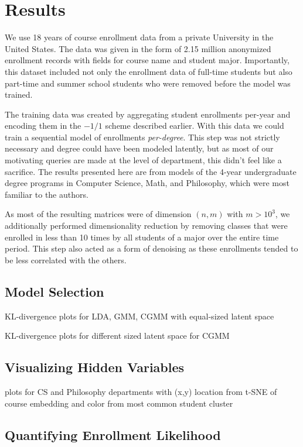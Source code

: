 \documentclass{edm_template}
\begin{document}
\section{Results}

We use 18 years of course enrollment data from a private University in the United States. The data was given in the form of 2.15 million anonymized enrollment records with fields for course name and student major. Importantly, this dataset included not only the enrollment data of full-time students but also part-time and summer school students who were removed before the model was trained. 

The training data was created by aggregating student enrollments per-year and encoding them in the $-1/1$ scheme described earlier. With this data we could train a sequential model of enrollments \textit{per-degree}. This step was not strictly necessary and degree could have been modeled latently, but as most of our motivating queries are made at the level of department, this didn't feel like a sacrifice. The results presented here are from models of the 4-year undergraduate degree programs in Computer Science, Math, and Philosophy, which were most familiar to the authors. 

As most of the resulting matrices were of dimension $(n,m)$ with $m > 10^3$, we additionally performed dimensionality reduction by removing classes that were enrolled in less than 10 times by all students of a major over the entire time period. This step also acted as a form of denoising as these enrollments tended to be less correlated with the others. 

\subsection{Model Selection}

KL-divergence plots for LDA, GMM, CGMM with equal-sized latent space

KL-divergence plots for different sized latent space for CGMM

\subsection{Visualizing Hidden Variables}

plots for CS and Philosophy departments with (x,y) location from t-SNE of course embedding and color from most common student cluster 

\subsection{Quantifying Enrollment Likelihood}
\end{document}
